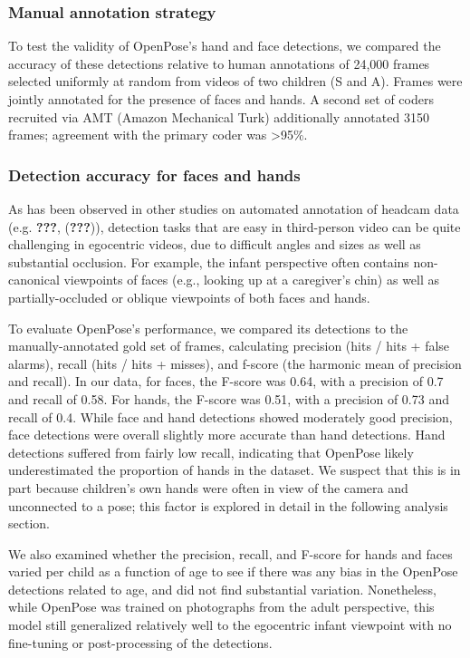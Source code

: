 \documentclass[10pt, letterpaper]{article}
\begin{document}
\subsubsection{Manual annotation
strategy}\label{manual-annotation-strategy}

To test the validity of OpenPose's hand and face detections, we compared
the accuracy of these detections relative to human annotations of 24,000
frames selected uniformly at random from videos of two children (S and
A). Frames were jointly annotated for the presence of faces and hands. A
second set of coders recruited via AMT (Amazon Mechanical Turk)
additionally annotated 3150 frames; agreement with the primary coder was
\textgreater{}95\%.

\subsubsection{Detection accuracy for faces and
hands}\label{detection-accuracy-for-faces-and-hands}

As has been observed in other studies on automated annotation of headcam
data (e.g. {\textbf{???}}, ({\textbf{???}})), detection tasks that are
easy in third-person video can be quite challenging in egocentric
videos, due to difficult angles and sizes as well as substantial
occlusion. For example, the infant perspective often contains
non-canonical viewpoints of faces (e.g., looking up at a caregiver's
chin) as well as partially-occluded or oblique viewpoints of both faces
and hands.

To evaluate OpenPose's performance, we compared its detections to the
manually-annotated gold set of frames, calculating precision (hits /
hits + false alarms), recall (hits / hits + misses), and f-score (the
harmonic mean of precision and recall). In our data, for faces, the
F-score was 0.64, with a precision of 0.7 and recall of 0.58. For hands,
the F-score was 0.51, with a precision of 0.73 and recall of 0.4. While
face and hand detections showed moderately good precision, face
detections were overall slightly more accurate than hand detections.
Hand detections suffered from fairly low recall, indicating that
OpenPose likely underestimated the proportion of hands in the dataset.
We suspect that this is in part because children's own hands were often
in view of the camera and unconnected to a pose; this factor is explored
in detail in the following analysis section.

We also examined whether the precision, recall, and F-score for hands
and faces varied per child as a function of age to see if there was any
bias in the OpenPose detections related to age, and did not find
substantial variation. Nonetheless, while OpenPose was trained on
photographs from the adult perspective, this model still generalized
relatively well to the egocentric infant viewpoint with no fine-tuning
or post-processing of the detections.
\end{document}
